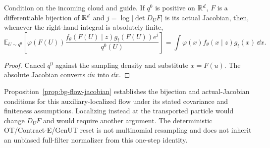 \begin{proposition}
\label{prop:bg-correction}
Condition on the incoming cloud and guide. If $q^0$ is positive on $\mathbb{R}^d$,
$F$ is a differentiable bijection of $\mathbb{R}^d$ and
$j=\log|\det D_UF|$ is its actual Jacobian, then, whenever the right-hand
integral is absolutely finite,
\[
 \mathbb E_{U\sim q^0}\!\left[
 \varphi(F(U))\frac{f_\theta(F(U)\mid z)g_t(F(U))e^j}{q^0(U)}\right]
 =\int\varphi(x)f_\theta(x\mid z)g_t(x)\,\dd x.
\]
\end{proposition}
\begin{proof}
Cancel $q^0$ against the sampling density and substitute $x=F(u)$.
The absolute Jacobian converts $\dd u$ into $\dd x$.
\end{proof}
Proposition~\ref{prop:bg-flow-jacobian} establishes the bijection and
actual-Jacobian conditions for this auxiliary-localized flow under its stated
covariance and finiteness assumptions. Localizing instead at the transported
particle would change $D_UF$ and would require another argument. The
deterministic OT/Contract-E/GenUT reset is not multinomial resampling and
does not inherit an unbiased full-filter normalizer from this one-step
identity.

